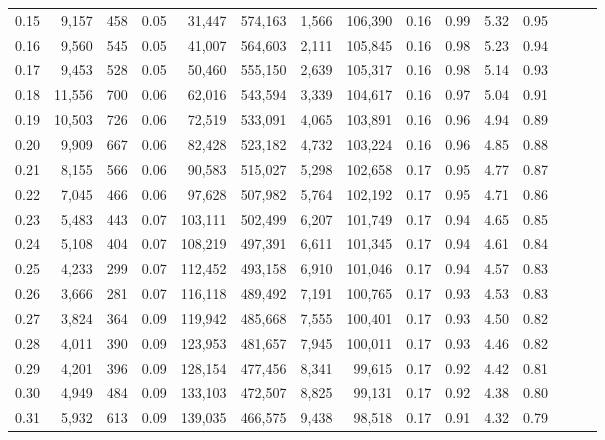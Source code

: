 \begin{tabular}{rrrrrrrrrrrrrrr}
0.15 &   9,157 &    458 &  0.05 &   31,447 &  574,163 &    1,566 &  106,390 &  0.16 &  0.99 &  5.32 &      0.95 \\
0.16 &   9,560 &    545 &  0.05 &   41,007 &  564,603 &    2,111 &  105,845 &  0.16 &  0.98 &  5.23 &      0.94 \\
0.17 &   9,453 &    528 &  0.05 &   50,460 &  555,150 &    2,639 &  105,317 &  0.16 &  0.98 &  5.14 &      0.93 \\
0.18 &  11,556 &    700 &  0.06 &   62,016 &  543,594 &    3,339 &  104,617 &  0.16 &  0.97 &  5.04 &      0.91 \\
0.19 &  10,503 &    726 &  0.06 &   72,519 &  533,091 &    4,065 &  103,891 &  0.16 &  0.96 &  4.94 &      0.89 \\
0.20 &   9,909 &    667 &  0.06 &   82,428 &  523,182 &    4,732 &  103,224 &  0.16 &  0.96 &  4.85 &      0.88 \\
0.21 &   8,155 &    566 &  0.06 &   90,583 &  515,027 &    5,298 &  102,658 &  0.17 &  0.95 &  4.77 &      0.87 \\
0.22 &   7,045 &    466 &  0.06 &   97,628 &  507,982 &    5,764 &  102,192 &  0.17 &  0.95 &  4.71 &      0.86 \\
0.23 &   5,483 &    443 &  0.07 &  103,111 &  502,499 &    6,207 &  101,749 &  0.17 &  0.94 &  4.65 &      0.85 \\
0.24 &   5,108 &    404 &  0.07 &  108,219 &  497,391 &    6,611 &  101,345 &  0.17 &  0.94 &  4.61 &      0.84 \\
0.25 &   4,233 &    299 &  0.07 &  112,452 &  493,158 &    6,910 &  101,046 &  0.17 &  0.94 &  4.57 &      0.83 \\
0.26 &   3,666 &    281 &  0.07 &  116,118 &  489,492 &    7,191 &  100,765 &  0.17 &  0.93 &  4.53 &      0.83 \\
0.27 &   3,824 &    364 &  0.09 &  119,942 &  485,668 &    7,555 &  100,401 &  0.17 &  0.93 &  4.50 &      0.82 \\
0.28 &   4,011 &    390 &  0.09 &  123,953 &  481,657 &    7,945 &  100,011 &  0.17 &  0.93 &  4.46 &      0.82 \\
0.29 &   4,201 &    396 &  0.09 &  128,154 &  477,456 &    8,341 &   99,615 &  0.17 &  0.92 &  4.42 &      0.81 \\
0.30 &   4,949 &    484 &  0.09 &  133,103 &  472,507 &    8,825 &   99,131 &  0.17 &  0.92 &  4.38 &      0.80 \\
0.31 &   5,932 &    613 &  0.09 &  139,035 &  466,575 &    9,438 &   98,518 &  0.17 &  0.91 &  4.32 &      0.79 \\

\end{tabular}
